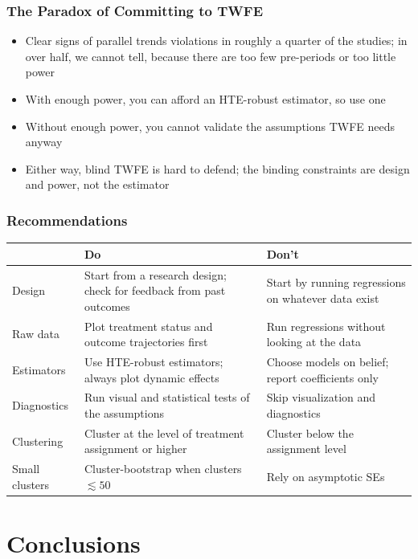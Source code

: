 \documentclass[xcolor=svgnames,9pt,english, aspectratio=169]{beamer}
\begin{document}
\begin{frame}
  \frametitle{The Paradox of Committing to TWFE}
\begin{itemize}[<+->]\itemsep1.2em
\item Clear signs of parallel trends violations in roughly a quarter of the studies; in over half, we \alert{cannot tell}, because there are too few pre-periods or too little power
\item With enough power, you can afford an HTE-robust estimator, so use one
\item Without enough power, you cannot \alert{validate} the assumptions TWFE needs anyway
\item Either way, blind TWFE is hard to defend; the binding constraints are \alert{design and power}, not the estimator
\end{itemize}
\end{frame}

\begin{frame}
  \frametitle{Recommendations}
\small
\begin{center}
\renewcommand{\arraystretch}{1.35}
\begin{tabular}{p{}p{}p{}}
 & \textbf{Do} & \textbf{Don't} \\ \hline
Design & Start from a research design; check for feedback from past outcomes & Start by running regressions on whatever data exist \\
Raw data & Plot treatment status and outcome trajectories first & Run regressions without looking at the data \\
Estimators & Use HTE-robust estimators; always plot dynamic effects & Choose models on belief; report coefficients only \\
Diagnostics & Run visual and statistical tests of the assumptions & Skip visualization and diagnostics \\
Clustering & Cluster at the level of treatment assignment or higher & Cluster below the assignment level \\
Small clusters & Cluster-bootstrap when clusters $\lesssim 50$ & Rely on asymptotic SEs \\ \hline
\end{tabular}
\end{center}
\end{frame}


\section{Conclusions}
\end{document}
